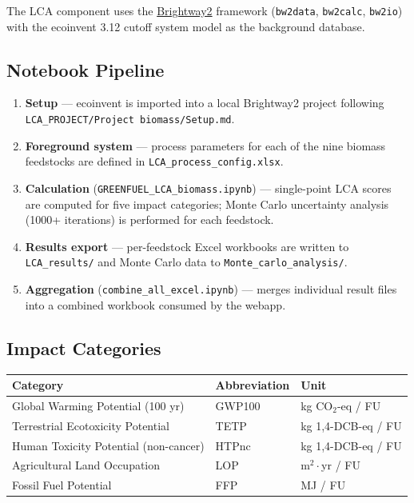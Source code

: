 \documentclass[12pt, a4paper]{article}
\begin{document}
The LCA component uses the \href{https://brightway.dev/}{Brightway2} framework (\texttt{bw2data}, \texttt{bw2calc}, \texttt{bw2io}) with the ecoinvent 3.12 cutoff system model as the background database.

\subsection{Notebook Pipeline}

\begin{enumerate}
    \item \textbf{Setup} — ecoinvent is imported into a local Brightway2 project following \texttt{LCA\_PROJECT/Project biomass/Setup.md}.
    \item \textbf{Foreground system} — process parameters for each of the nine biomass feedstocks are defined in \texttt{LCA\_process\_config.xlsx}.
    \item \textbf{Calculation} (\texttt{GREENFUEL\_LCA\_biomass.ipynb}) — single-point LCA scores are computed for five impact categories; Monte Carlo uncertainty analysis (1000+ iterations) is performed for each feedstock.
    \item \textbf{Results export} — per-feedstock Excel workbooks are written to \texttt{LCA\_results/} and Monte Carlo data to \texttt{Monte\_carlo\_analysis/}.
    \item \textbf{Aggregation} (\texttt{combine\_all\_excel.ipynb}) — merges individual result files into a combined workbook consumed by the webapp.
\end{enumerate}

\subsection{Impact Categories}

\begin{longtable}{lll}
\toprule
\textbf{Category} & \textbf{Abbreviation} & \textbf{Unit} \\
\midrule
Global Warming Potential (100 yr) & GWP100 & kg CO$_2$-eq / FU \\
Terrestrial Ecotoxicity Potential & TETP & kg 1,4-DCB-eq / FU \\
Human Toxicity Potential (non-cancer) & HTPnc & kg 1,4-DCB-eq / FU \\
Agricultural Land Occupation & LOP & m$^2 \cdot$yr / FU \\
Fossil Fuel Potential & FFP & MJ / FU \\
\bottomrule
\end{longtable}
\end{document}
